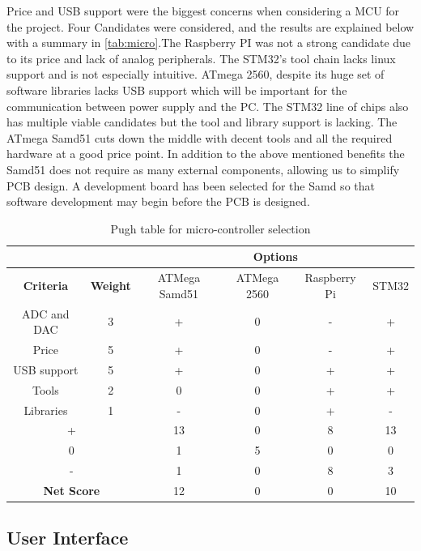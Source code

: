 \documentclass[12pt]{article}
\begin{document}
Price and USB support were the biggest concerns when considering a MCU for the project. Four Candidates were considered, and the results are explained below with a summary in \autoref{tab:micro}.The Raspberry PI was not a strong candidate due to its price and lack of analog peripherals. The STM32’s tool chain lacks linux support and is not especially intuitive. ATmega 2560, despite its huge set of software libraries lacks USB support which will be important for the communication between power supply and the PC. The STM32 line of chips also has multiple viable candidates but the tool and library support is lacking. The ATmega Samd51 cuts down the middle with decent tools and all the required hardware at a good price point. In addition to the above mentioned benefits the Samd51 does not require as many external components, allowing us to simplify PCB design. A development board has been selected for the Samd so that software development may begin before the PCB is designed.

\begin{table}[H]
    \centering
    \begin{tabular}{ |c|c||c|c|c|c|  }
    \cline{3-6}
    \multicolumn{1}{c}{}& \multicolumn{1}{c}{}&  \multicolumn{4}{|c|}{\textbf{Options}} \\
    \hline
    \textbf{Criteria} & \textbf{Weight} & ATMega Samd51 & ATMega 2560 & Raspberry Pi & STM32 \\ 
    \hline
    ADC and DAC & 3 & + & 0 & - & + \\
    Price & 5 & + & 0 & - & + \\
    USB support & 5 & + & 0 & + & + \\
    Tools & 2 & 0 & 0 & + & + \\
    Libraries & 1 & - & 0 & + & - \\ 
    \hline
    \hline
    \multicolumn{2}{|c||}{+} & 13 & 0 & 8 & 13\\
    \multicolumn{2}{|c||}{0} & 1 & 5 & 0 & 0\\
    \multicolumn{2}{|c||}{-} & 1 & 0 & 8 & 3\\
    \hline \hline
    \multicolumn{2}{|c||}{\textbf{Net Score}} & 12 & 0 & 0 & 10\\
    \hline
\end{tabular}
\caption{Pugh table for micro-controller selection }
\label{tab:micro}
\end{table}

\subsection{User Interface}
\end{document}
